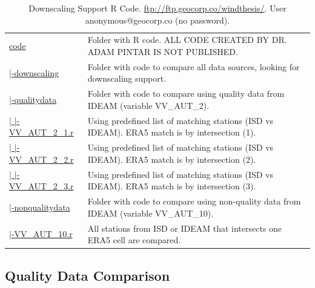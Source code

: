 \documentclass[12pt,twoside]{reedthesis}
\begin{document}
\begingroup\fontsize{7}{9}\selectfont
\begin{longtable}[t]{>{\raggedright\arraybackslash}p{1.3in}>{\raggedright\arraybackslash}p{4.9in}}
\caption[Downscaling Support R Code]{\label{tab:codeds}Downscaling Support R Code. \href{ftp://ftp.geocorp.co/windthesis/}{ftp://ftp.geocorp.co/windthesis/}. User anonymous@geocorp.co (no password).}\\
\toprule
\multicolumn{1}{l}{Folder Tree - Ftp Links} & \multicolumn{1}{l}{Description}\\
\midrule
\href{ftp://ftp.geocorp.co/windthesis/code/}{code} & Folder with R code. ALL CODE CREATED BY DR. ADAM PINTAR IS NOT PUBLISHED.\\
\href{ftp://ftp.geocorp.co/windthesis/code/downscaling/}{\;\;|-downscaling} & Folder with code to compare all data sources, looking for downscaling support.\\
\href{ftp://ftp.geocorp.co/windthesis/code/downscaling/qualitydata/}{\;\;\;\;|-qualitydata} & Folder with code to compare using quality data from IDEAM (variable VV\_AUT\_2).\\
\href{ftp://ftp.geocorp.co/windthesis/code/downscaling/qualitydata/comparing_VV_AUT_2_1.r}{\;\;\;\;|    |-VV\_AUT\_2\_1.r} & Using predefined list of matching stations (ISD vs IDEAM). ERA5 match is by intersection (1).\\
\href{ftp://ftp.geocorp.co/windthesis/code/downscaling/qualitydata/comparing_VV_AUT_2_2.r}{\;\;\;\;|    |-VV\_AUT\_2\_2.r} & Using predefined list of matching stations (ISD vs IDEAM). ERA5 match is by intersection (2).\\
\href{ftp://ftp.geocorp.co/windthesis/code/downscaling/qualitydata/comparing_VV_AUT_2_3.r}{\;\;\;\;|    |-VV\_AUT\_2\_3.r} & Using predefined list of matching stations (ISD vs IDEAM). ERA5 match is by intersection (3).\\
\href{ftp://ftp.geocorp.co/windthesis/code/downscaling/nonqualitydata/}{\;\;\;\;|-nonqualitydata} & Folder with code to compare using non-quality data from IDEAM (variable VV\_AUT\_10).\\
\href{ftp://ftp.geocorp.co/windthesis/code/downscaling/nonqualitydata/comparing_VV_AUT_10.r}{\;\;\;\;\;\;|-VV\_AUT\_10.r} & All stations from ISD or IDEAM that intersects one ERA5 cell are compared.\\
\bottomrule
\end{longtable}
\endgroup{}

\hypertarget{quality-data-comparison}{%
\subsection{Quality Data Comparison}\label{quality-data-comparison}}
\end{document}
